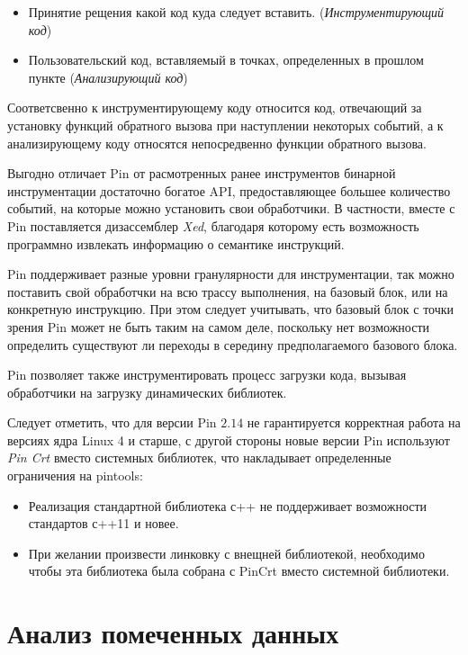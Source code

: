 \begin{itemize}
    \item Принятие рещения какой код куда следует вставить. (\emph{Инструментирующий код})
    \item Пользовательский код, вставляемый в точках, определенных в прошлом пункте (\emph{Анализирующий код})
\end{itemize}

Соответсвенно к инструментирующему коду относится код, отвечающий за установку функций обратного вызова при наступлении некоторых событий, а к анализирующему коду относятся непосредвенно функции обратного вызова.

Выгодно отличает Pin от расмотренных ранее инструментов бинарной инструментации достаточно богатое API, предоставляющее большее количество событий, на которые можно установить свои обработчики. В частности, вместе с Pin поставляется дизассемблер \emph{Xed}, благодаря которому есть возможность программно извлекать информацию о семантике инструкций.

Pin поддерживает разные уровни гранулярности для инструментации, так можно поставить свой обработчки на всю трассу выполнения, на базовый блок, или на конкретную инструкцию. При этом следует учитывать, что базовый блок с точки зрения Pin может не быть таким на самом деле, поскольку нет возможности определить существуют ли переходы в середину предполагаемого базового блока.

Pin позволяет также инструментировать процесс загрузки кода, вызывая обработчики на загрузку динамических библиотек.

Следует отметить, что для версии Pin $2.14$ не гарантируется корректная работа на версиях ядра Linux 4 и старше, с другой стороны новые версии Pin используют \emph{Pin Crt} вместо системных библиотек, что накладывает определенные ограничения на pintools:

\begin{itemize}
    \item Реализация стандартной библиотека с++ не поддерживает возможности стандартов с++11 и новее.
    \item При желании произвести линковку с внещней библиотекой, необходимо чтобы эта библиотека была собрана с PinCrt вместо системной библиотеки.
\end{itemize}

\section{Анализ помеченных данных}

